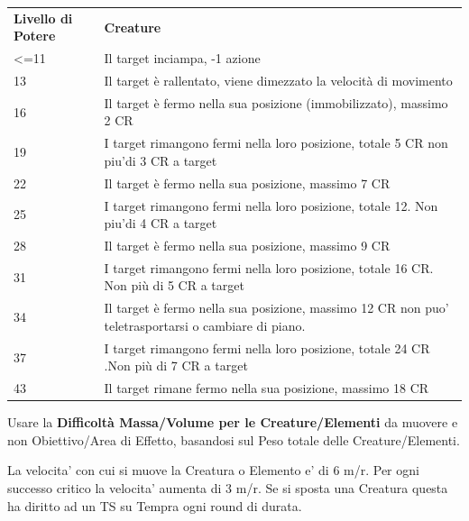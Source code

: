 \documentclass[a4paper,11pt,twoside,openany]{book}
\begin{document}
\bigskip

\begin{tabularx}{0.95\textwidth}{lX}
	\toprule
	\textbf{Livello di Potere} & \textbf{Creature}\\
	\textless=11   & Il target inciampa, -1 azione\\
	13       & Il target è rallentato, viene dimezzato la velocità di movimento\\
	16       & Il target è fermo nella sua posizione (immobilizzato), massimo 2	CR\\
	19       & I target rimangono fermi nella loro posizione, totale 5 CR non piu'di 3 CR a target\\
	22       & Il target è fermo nella sua posizione, massimo 7 CR\\
	25       & I target rimangono fermi nella loro posizione, totale 12. Non piu'di 4 CR a target\\
	28      & Il target è fermo nella sua posizione, massimo 9 CR\\
	31      & I target rimangono fermi nella loro posizione, totale 16 CR. Non più di 5 CR a target\\
	34       & Il target è fermo nella sua posizione, massimo 12 CR non puo' teletrasportarsi o cambiare di piano.\\
	37       & I target rimangono fermi nella loro posizione, totale 24 CR .Non più di 7 CR a target\\
	43      & Il target rimane fermo nella sua posizione, massimo 18 CR\\
\end{tabularx}

\bigskip

Usare la \textbf{Difficoltà Massa/Volume per le Creature/Elementi} da muovere e non Obiettivo/Area di Effetto, basandosi sul Peso totale delle Creature/Elementi.

La velocita' con cui si muove la Creatura o Elemento e' di 6 m/r. Per ogni successo critico la velocita' aumenta di 3 m/r.
Se si sposta una Creatura questa ha diritto ad un TS su Tempra ogni round di durata.
\bigskip\
\end{document}
